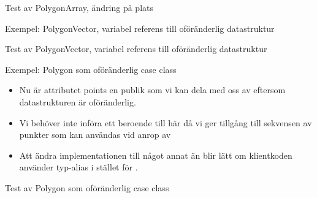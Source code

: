 \begin{Slide}{Test av PolygonArray, ändring på plats}
\vspace{0em}
\end{Slide}


\begin{Slide}{Exempel: PolygonVector, variabel referens till oföränderlig datastruktur}
\vspace{-0.6em}
\end{Slide}

\begin{Slide}{Test av PolygonVector, variabel referens till oföränderlig datastruktur}
\vspace{0em}
\end{Slide}


\begin{Slide}{Exempel: Polygon som oföränderlig case class}
\vspace{-0.6em}
\begin{itemize}\SlideFontTiny
\item Nu är attributet points en publik  som vi kan dela med oss av eftersom datastrukturen  är oföränderlig.

\item Vi behöver inte införa ett beroende till  här då vi ger tillgång till sekvensen av punkter som kan användas vid anrop av 

\item Att ändra implementationen till något annat än  blir lätt om klientkoden använder typ-alias  i stället för .
\end{itemize}
\end{Slide}

\begin{Slide}{Test av Polygon som oföränderlig case class}
\vspace{0em}
\end{Slide}
